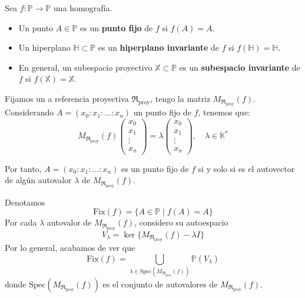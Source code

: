\begin{definición}
    Sea $f: \mathbb{P} \to \mathbb{P}$ una homografía.
    \begin{itemize}
        \item Un punto $A \in \mathbb{P}$ es un \textbf{punto fijo} de $f$ si $f(A) = A$.
        \item Un hiperplano $\mathbb{H} \subset \mathbb{P}$ es un \textbf{hiperplano invariante} de $f$ si $f(\mathbb{H}) = \mathbb{H}$.
        \item En general, un subespacio proyectivo $\mathbb{X} \subset \mathbb{P}$ es un \textbf{subespacio invariante} de $f$ si $f(\mathbb{X}) = \mathbb{X}$.
    \end{itemize}
\end{definición}

Fijamos un a referencia proyectiva $\mathfrak{R}_{\text{proy}}$, tengo la matriz $M_{\mathfrak{R}_{\text{proy}}}(f)$. Considerando $A = (x_0: x_1: \ldots : x_n)$ un punto fijo de $f$, tenemos que:
\[
M_{\mathfrak{R}_{\text{proy}}}(f) \begin{pmatrix}
    x_0 \\ x_1 \\ \vdots \\ x_n
\end{pmatrix} = \lambda \begin{pmatrix}
    x_0 \\ x_1 \\ \vdots \\ x_n
\end{pmatrix}, \quad \lambda \in \mathbb{K}^*
\]

Por tanto, $A=(x_0: x_1: \ldots : x_n)$ es un punto fijo de $f$ si y solo si es el autovector de algún autovalor $\lambda$ de $M_{\mathfrak{R}_{\text{proy}}}(f)$.

Denotamos 
\[
    \text{Fix}(f) = \{ A \in \mathbb{P} \mid f(A) = A \}
\]
Por cada $\lambda$ autovalor de $M_{\mathfrak{R}_{\text{proy}}}(f)$, considero su autoespacio
\[
    V_\lambda = \ker\{M_{\mathfrak{R}_{\text{proy}}}(f) - \lambda I\}
\]
Por lo general, acabamos de ver que
\[
    \text{Fix}(f) = \bigcup_{\lambda \in \text{Spec}(M_{\mathfrak{R}_{\text{proy}}}(f))} \mathbb{P}(V_\lambda)
\]
donde $\text{Spec}(M_{\mathfrak{R}_{\text{proy}}}(f))$ es el conjunto de autovalores de $M_{\mathfrak{R}_{\text{proy}}}(f)$.\\

